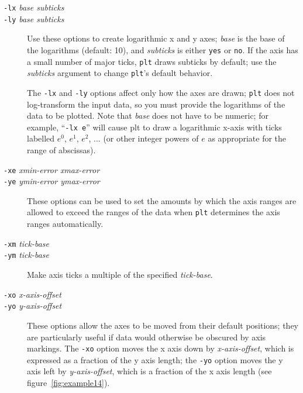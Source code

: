 \documentclass{book}
\begin{document}
\begin{description}
%
%
\item[{\tt -lx} {\em base subticks}]
\item[{\tt -ly} {\em base subticks}]
Use these options to create logarithmic x and y axes;  {\em base} is the
base of the logarithms (default: 10), and {\em subticks} is either {\tt yes}
or {\tt no}.  If the axis has a small number of major ticks, {\tt plt}
draws subticks by default;  use the {\em subticks} argument to change
{\tt plt}'s default behavior.

The {\tt -lx} and {\tt -ly} options affect only how the axes are
drawn;  {\tt plt} does not log-transform the input data, so you must provide
the logarithms of the data to be plotted.  Note that {\em base} does
not have to be numeric;  for example, ``{\tt -lx e}'' will cause plt
to draw a logarithmic x-axis with ticks labelled $e^0$, $e^1$, $e^2$,
... (or other integer powers of $e$ as appropriate for the range of abscissas).

%
%
\item[{\tt -xe} {\em xmin-error xmax-error}]
\item[{\tt -ye} {\em ymin-error ymax-error}]
These options can be used to set the amounts by which the axis ranges are
allowed to exceed the ranges of the data when {\tt plt} determines the
axis ranges automatically.

%
%
\item[{\tt -xm} {\em tick-base}]
\item[{\tt -ym} {\em tick-base}]
Make axis ticks a multiple of the specified {\em tick-base}.

%
%
\item[{\tt -xo} {\em x-axis-offset}]
\item[{\tt -yo} {\em y-axis-offset}]
These options allow the axes to be moved from their default positions;
they are particularly useful if data would otherwise be obscured by axis
markings.  The {\tt -xo} option moves the x axis down by {\em x-axis-offset},
which is expressed as a fraction of the y axis length;  the {\tt -yo} option
moves the y axis left by {\em y-axis-offset}, which is a fraction of the x axis
length (see figure~\ref{fig:example14}).


\end{description}
\end{document}
